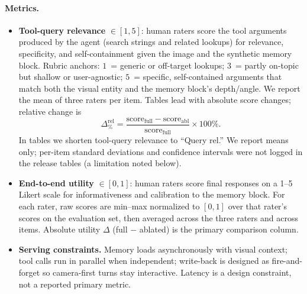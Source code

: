 \documentclass[11pt,a4paper]{article}
\begin{document}
\paragraph{Metrics.}
\begin{itemize}[leftmargin=*]
    \item \textbf{Tool-query relevance} $\in [1,5]$: human raters score the tool arguments produced by the agent (search strings and related lookups) for relevance, specificity, and self-containment given the image and the synthetic memory block. Rubric anchors: $1$~= generic or off-target lookups; $3$~= partly on-topic but shallow or user-agnostic; $5$~= specific, self-contained arguments that match both the visual entity and the memory block's depth/angle. We report the mean of three raters per item. Tables lead with absolute score changes; relative change is
    \[
      \Delta_{\%}^{\mathrm{rel}} = \frac{\mathrm{score}_{\mathrm{full}} - \mathrm{score}_{\mathrm{abl}}}{\mathrm{score}_{\mathrm{full}}} \times 100\%.
    \]
    In tables we shorten tool-query relevance to ``Query rel.'' We report means only; per-item standard deviations and confidence intervals were not logged in the release tables (a limitation noted below).
    \item \textbf{End-to-end utility} $\in [0,1]$: human raters score final responses on a 1--5 Likert scale for informativeness and calibration to the memory block. For each rater, raw scores are min--max normalized to $[0,1]$ over that rater's scores on the evaluation set, then averaged across the three raters and across items. Absolute utility $\Delta$ (full $-$ ablated) is the primary comparison column.
    \item \textbf{Serving constraints.} Memory loads asynchronously with visual context; tool calls run in parallel when independent; write-back is designed as fire-and-forget so camera-first turns stay interactive. Latency is a design constraint, not a reported primary metric.
\end{itemize}
\end{document}
